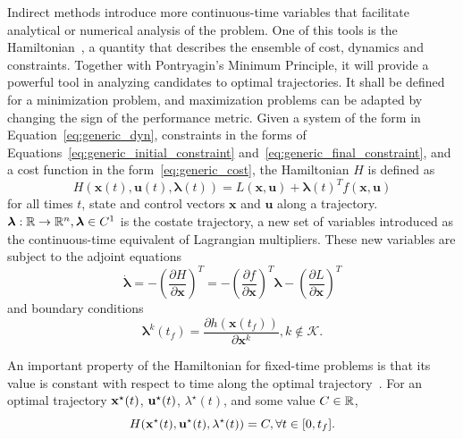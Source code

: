 Indirect methods introduce more continuous-time variables that facilitate analytical or numerical analysis of the problem. One of this tools is the Hamiltonian~\cite{Conway_2010}, a quantity that describes the ensemble of cost, dynamics and constraints. Together with Pontryagin's Minimum Principle, it will provide a powerful tool in analyzing candidates to optimal trajectories. It shall be defined for a minimization problem, and maximization problems can be adapted by changing the sign of the performance metric. Given a system of the form in Equation~\eqref{eq:generic_dyn}, constraints in the forms of Equations~\eqref{eq:generic_initial_constraint} and~\eqref{eq:generic_final_constraint}, and a cost function in the form~\eqref{eq:generic_cost}, the Hamiltonian \(H\) is defined as~\cite{bertsekas}
\begin{equation}
    H(\mathbf{x}(t), \mathbf{u}(t), \boldsymbol{\lambda}(t)) = L(\mathbf{x}, \mathbf{u}) + \boldsymbol{\lambda}{(t)}^T f(\mathbf{x}, \mathbf{u})
\end{equation}
for all times \(t\), state and control vectors \(\mathbf{x}  \) and \(\mathbf{u}\) along a trajectory.\ \( \boldsymbol{\lambda}: \mathbb{R} \rightarrow \mathbb{R}^n, \boldsymbol{\lambda} \in C^1\) is the costate trajectory, a new set of variables introduced as the continuous-time equivalent of Lagrangian multipliers. These new variables are subject to the adjoint equations
\begin{equation}
    \dot{\boldsymbol{\lambda}} = - \left( \frac{\partial H}{\partial \mathbf{x}} \right)^T = -\left( \frac{\partial f}{\partial \mathbf{x}} \right)^T \boldsymbol{\lambda} - \left( \frac{\partial L}{\partial \mathbf{x}} \right)^T
\end{equation}
and boundary conditions~\cite{bryson_applied_optimal_control}
\begin{equation}\label{eq:final_costate}
    \boldsymbol{\lambda}^k(t_f) = \frac{\partial h(\mathbf{x}(t_f))}{\partial \mathbf{x}^k}, k \notin \mathcal{K}.
\end{equation}

An important property of the Hamiltonian for fixed-time problems is that its value is constant with respect to time along the optimal trajectory~\cite{bertsekas}. For an optimal trajectory \(\mathbf{x}^\star(t)\), \(\mathbf{u}^\star(t)\), \(\lambda^\star(t)\), and some value \(C \in \mathbb{R}\),
\begin{equation}\label{eq:constant_hamilt}
    H(\x^\star(t), \uc^\star(t), \lambda^\star(t)) = C, \forall t \in [0, t_f].
\end{equation}

